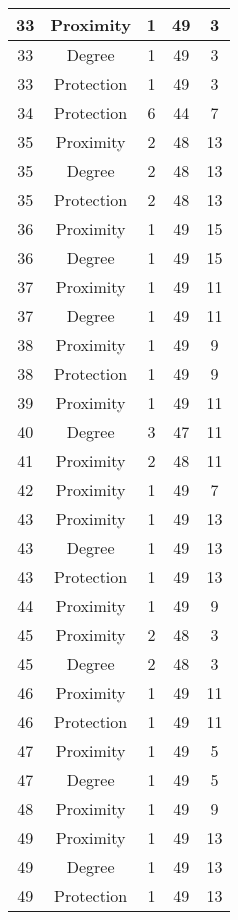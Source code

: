 \documentclass[results.tex]{subfiles}
\begin{document}
\begin{center}
\begin{tabular}{| c || c | c | c | c |}
    \hline
    33 & Proximity & 1 & 49 & 3 \\ 
    \hline
    33 & Degree & 1 & 49 & 3 \\ 
    \hline
    33 & Protection & 1 & 49 & 3 \\ 
    \hline
    34 & Protection & 6 & 44 & 7 \\ 
    \hline
    35 & Proximity & 2 & 48 & 13 \\ 
    \hline
    35 & Degree & 2 & 48 & 13 \\ 
    \hline
    35 & Protection & 2 & 48 & 13 \\ 
    \hline
    36 & Proximity & 1 & 49 & 15 \\ 
    \hline
    36 & Degree & 1 & 49 & 15 \\ 
    \hline
    37 & Proximity & 1 & 49 & 11 \\ 
    \hline
    37 & Degree & 1 & 49 & 11 \\ 
    \hline
    38 & Proximity & 1 & 49 & 9 \\ 
    \hline
    38 & Protection & 1 & 49 & 9 \\ 
    \hline
    39 & Proximity & 1 & 49 & 11 \\ 
    \hline
    40 & Degree & 3 & 47 & 11 \\ 
    \hline
    41 & Proximity & 2 & 48 & 11 \\ 
    \hline
    42 & Proximity & 1 & 49 & 7 \\ 
    \hline
    43 & Proximity & 1 & 49 & 13 \\ 
    \hline
    43 & Degree & 1 & 49 & 13 \\ 
    \hline
    43 & Protection & 1 & 49 & 13 \\ 
    \hline
    44 & Proximity & 1 & 49 & 9 \\ 
    \hline
    45 & Proximity & 2 & 48 & 3 \\ 
    \hline
    45 & Degree & 2 & 48 & 3 \\ 
    \hline
    46 & Proximity & 1 & 49 & 11 \\ 
    \hline
    46 & Protection & 1 & 49 & 11 \\ 
    \hline
    47 & Proximity & 1 & 49 & 5 \\ 
    \hline
    47 & Degree & 1 & 49 & 5 \\ 
    \hline
    48 & Proximity & 1 & 49 & 9 \\ 
    \hline
    49 & Proximity & 1 & 49 & 13 \\ 
    \hline
    49 & Degree & 1 & 49 & 13 \\ 
    \hline
    49 & Protection & 1 & 49 & 13 \\ 
    \hline   \end{tabular}
\end{center}
\end{document}
